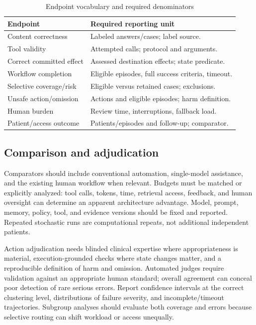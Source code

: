 \begin{table}[t]\caption{Endpoint vocabulary and required denominators}\label{tab:metrics}\centering\footnotesize
\begin{tabularx}{\columnwidth}{@{}p{}Y@{}}\toprule
Endpoint & Required reporting unit \\ \midrule
Content correctness & Labeled answers/cases; label source.\\
Tool validity & Attempted calls; protocol and arguments.\\
Correct committed effect & Assessed destination effects; state predicate.\\
Workflow completion & Eligible episodes, full success criteria, timeout.\\
Selective coverage/risk & Eligible versus retained cases; exclusions.\\
Unsafe action/omission & Actions and eligible episodes; harm definition.\\
Human burden & Review time, interruptions, fallback load.\\
Patient/access outcome & Patients/episodes and follow-up; comparator.\\ \bottomrule
\end{tabularx}\end{table}

\subsection{Comparison and adjudication}
Comparators should include conventional automation, single-model assistance, and the existing human workflow when relevant. Budgets must be matched or explicitly analyzed: tool calls, tokens, time, retrieval access, feedback, and human oversight can determine an apparent architecture advantage. Model, prompt, memory, policy, tool, and evidence versions should be fixed and reported. Repeated stochastic runs are computational repeats, not additional independent patients.

Action adjudication needs blinded clinical expertise where appropriateness is material, execution-grounded checks where state changes matter, and a reproducible definition of harm and omission. Automated judges require validation against an appropriate human standard; overall agreement can conceal poor detection of rare serious errors. Report confidence intervals at the correct clustering level, distributions of failure severity, and incomplete/timeout trajectories. Subgroup analyses should evaluate both coverage and errors because selective routing can shift workload or access unequally.

